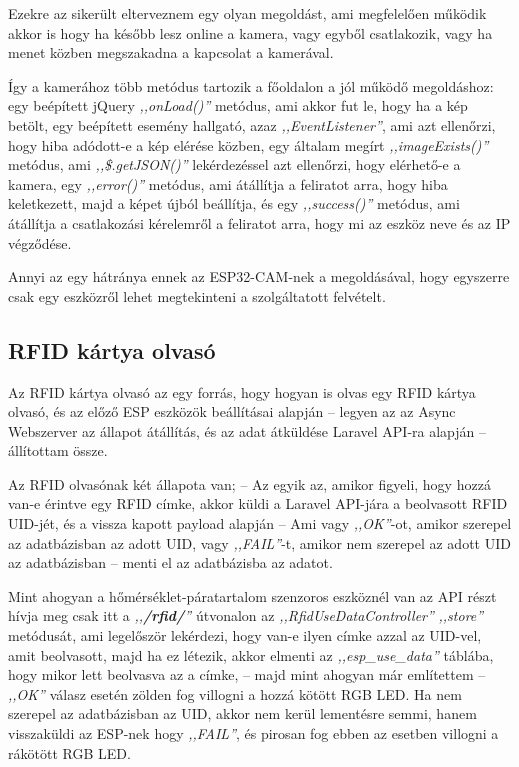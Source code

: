 \documentclass[
]{thesis-ekf}
\theoremstyle{definition}
\theoremstyle{remark}
\begin{document}
	Ezekre az sikerült elterveznem egy olyan megoldást, ami megfelelően működik akkor is hogy ha később lesz online a kamera, vagy egyből csatlakozik, vagy ha menet közben megszakadna a kapcsolat a kamerával. 
	
	Így a kamerához több metódus tartozik a főoldalon a jól működő megoldáshoz: egy beépített jQuery \emph{,,onLoad()''} metódus, ami akkor fut le, hogy ha a kép betölt, egy beépített esemény hallgató, azaz \emph{,,EventListener''}, ami azt ellenőrzi, hogy hiba adódott-e a kép elérése közben, egy általam megírt \emph{,,imageExists()''} metódus, ami \emph{,,\$.getJSON()''} lekérdezéssel azt ellenőrzi, hogy elérhető-e a kamera, egy \emph{,,error()''} metódus, ami átállítja a feliratot arra, hogy hiba keletkezett, majd a képet újból beállítja, és egy \emph{,,success()''} metódus, ami átállítja a csatlakozási kérelemről a feliratot arra, hogy mi az eszköz neve és az IP végződése.
	
	Annyi az egy hátránya ennek az ESP32-CAM-nek a megoldásával, hogy egyszerre csak egy eszközről lehet megtekinteni a szolgáltatott felvételt.
	 
	\subsection{RFID kártya olvasó}\label{rfid-working}
	
	Az RFID kártya olvasó az egy forrás\cite{RFID-card-reader}, hogy hogyan is olvas egy RFID kártya olvasó, és az előző ESP eszközök beállításai alapján -- legyen az az Async Webszerver az állapot átállítás, és az adat átküldése Laravel API-ra alapján -- állítottam össze.
	
	Az RFID olvasónak két állapota van; -- Az egyik az, amikor figyeli, hogy hozzá van-e érintve egy RFID címke, akkor küldi a Laravel API-jára a beolvasott RFID UID-jét, és a vissza kapott payload alapján -- Ami vagy \emph{,,OK''}-ot, amikor szerepel az adatbázisban az adott UID, vagy \emph{,,FAIL''}-t, amikor nem szerepel az adott UID az adatbázisban -- menti el az adatbázisba az adatot. 
	
	Mint ahogyan a hőmérséklet-páratartalom szenzoros eszköznél van az API részt hívja meg csak itt a \emph{,,\textbf{/rfid/}''} útvonalon az \emph{,,RfidUseDataController''} \emph{,,store''} metódusát, ami legelőször lekérdezi, hogy van-e ilyen címke azzal az UID-vel, amit beolvasott, majd ha ez létezik, akkor elmenti az \emph{,,esp\_use\_data''} táblába, hogy mikor lett beolvasva az a címke, -- majd mint ahogyan már említettem -- \emph{,,OK''} válasz esetén zölden fog villogni a hozzá kötött RGB LED. Ha nem szerepel az adatbázisban az UID, akkor nem kerül lementésre semmi, hanem visszaküldi az ESP-nek hogy \emph{,,FAIL''}, és pirosan fog ebben az esetben villogni a rákötött RGB LED.
	
\end{document}
